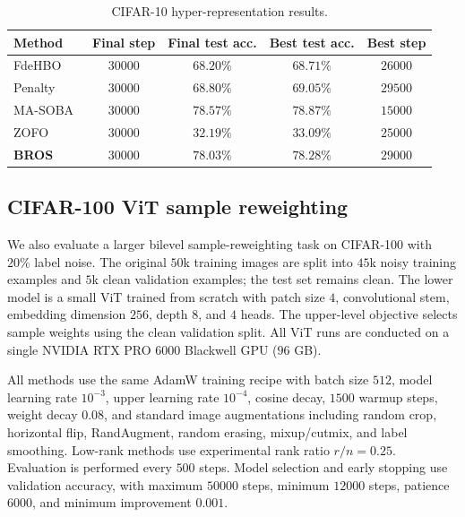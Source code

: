 \documentclass{pkumelon}
\theoremstyle{plain}
\newcommand{\oursname}{\textnormal{\textbf{BROS}}}
\newcommand{\ourslast}{\oursname}
\begin{document}
\begin{table}[t!]
\centering
\caption{CIFAR-10 hyper-representation results.}
\label{tab:hyper_representation_appendix}
\small
\setlength{\tabcolsep}{6pt}
\renewcommand{\arraystretch}{1.18}
\begin{tabular}{lcccc}
\toprule
Method & Final step & Final test acc. & Best test acc. & Best step \\
\midrule
FdeHBO~\citep{yang2023achieving} & $30000$ & $68.20\%$ & $68.71\%$ & $26000$ \\
Penalty~\citep{mehra2021penalty} & $30000$ & $68.80\%$ & $69.05\%$ & $29500$ \\
MA-SOBA~\citep{chen2024optimal} & $30000$ & $78.57\%$ & $78.87\%$ & $15000$ \\
ZOFO~\citep{shirkavand2025bilevel} & $30000$ & $32.19\%$ & $33.09\%$ & $25000$ \\
\rowcolor{boxbg}
\ourslast & $30000$ & $78.03\%$ & $78.28\%$ & $29000$ \\
\bottomrule
\end{tabular}
\end{table}

\subsection{CIFAR-100 ViT sample reweighting}
We also evaluate a larger bilevel sample-reweighting task on CIFAR-100 with $20\%$ label noise. The original $50$k training images are split into $45$k noisy training examples and $5$k clean validation examples; the test set remains clean. The lower model is a small ViT trained from scratch with patch size $4$, convolutional stem, embedding dimension $256$, depth $8$, and $4$ heads. The upper-level objective selects sample weights using the clean validation split.
All ViT runs are conducted on a single NVIDIA RTX PRO 6000 Blackwell GPU ($96$ GB).

All methods use the same AdamW training recipe with batch size $512$, model learning rate $10^{-3}$, upper learning rate $10^{-4}$, cosine decay, $1500$ warmup steps, weight decay $0.08$, and standard image augmentations including random crop, horizontal flip, RandAugment, random erasing, mixup/cutmix, and label smoothing. Low-rank methods use experimental rank ratio $r/n=0.25$. Evaluation is performed every $500$ steps. Model selection and early stopping use validation accuracy, with maximum $50000$ steps, minimum $12000$ steps, patience $6000$, and minimum improvement $0.001$.
\end{document}
